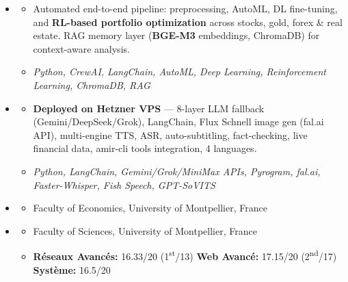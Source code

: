 \documentclass[11pt,a4paper]{article}
\renewcommand{\itemspace}{\vspace{0.25em}}
\begin{document}
\begin{itemize}[leftmargin=1em, label={}]
    \item
    \begin{itemize}[leftmargin=1.5em, label=$\bullet$, nosep]
        \item Automated end-to-end pipeline: preprocessing, AutoML, DL fine-tuning, and \textbf{RL-based portfolio optimization} across stocks, gold, forex \& real estate. RAG memory layer (\textbf{BGE-M3} embeddings, ChromaDB) for context-aware analysis.
        \item \emph{Python, CrewAI, LangChain, AutoML, Deep Learning, Reinforcement Learning, ChromaDB, RAG}
    \end{itemize}

    \itemspace
    \item
    \begin{itemize}[leftmargin=1.5em, label=$\bullet$, nosep]
        \item \textbf{Deployed on Hetzner VPS} — 8-layer LLM fallback (Gemini/DeepSeek/Grok), LangChain, Flux Schnell image gen (fal.ai API), multi-engine TTS, ASR, auto-subtitling, fact-checking, live financial data, amir-cli tools integration, 4 languages.
        \item \emph{Python, LangChain, Gemini/Grok/MiniMax APIs, Pyrogram, fal.ai, Faster-Whisper, Fish Speech, GPT-SoVITS}
    \end{itemize}

\end{itemize}

\begin{itemize}[leftmargin=1em, label={}]
    \item
    \begin{itemize}[leftmargin=1.5em, label=$\bullet$, nosep]
        \item Faculty of Economics, University of Montpellier, France
    \end{itemize}

    \itemspace
    \item
    \begin{itemize}[leftmargin=1.5em, label=$\bullet$, nosep]
        \item Faculty of Sciences, University of Montpellier, France
        \item \textbf{R\'{e}seaux Avanc\'{e}s:} 16.33/20 (1\textsuperscript{st}/13) \quad \textbf{Web Avanc\'{e}:} 17.15/20 (2\textsuperscript{nd}/17) \quad \textbf{Syst\`{e}me:} 16.5/20
    \end{itemize}
\end{itemize}
\end{document}
